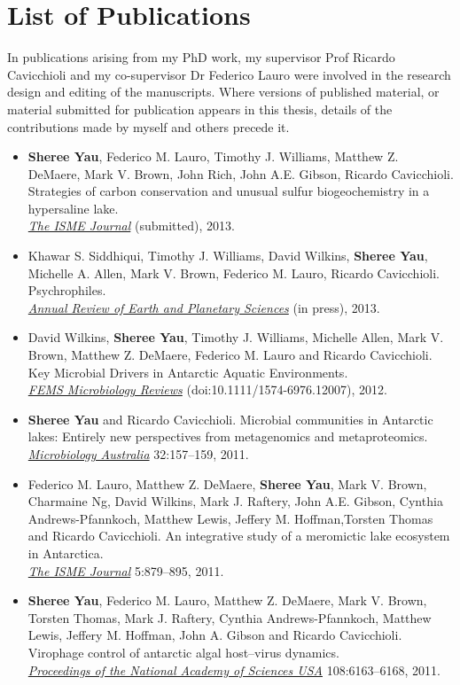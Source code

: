 \chapter*{List of Publications}
In publications arising from my PhD work, my supervisor Prof Ricardo Cavicchioli and my co-supervisor Dr Federico Lauro were
involved in the research design and editing of the manuscripts.
Where versions of published material, or material submitted for publication appears in this thesis, details of the contributions made by myself and others precede it.

\begin{itemize}

\item \textbf{Sheree Yau}, Federico M. Lauro, Timothy J. Williams, Matthew Z. DeMaere, Mark V. Brown, John Rich, John A.E. Gibson, Ricardo Cavicchioli. 
Strategies of carbon conservation and unusual sulfur biogeochemistry in a hypersaline lake. \\
\emph{\underline{The ISME Journal}}
(submitted), 2013.

\item Khawar S. Siddhiqui, Timothy J. Williams, David Wilkins, \textbf{Sheree Yau}, Michelle A. Allen, Mark V. Brown, Federico M. Lauro, Ricardo Cavicchioli.
Psychrophiles.\\
\emph{\underline{Annual Review of Earth and Planetary Sciences}}
(in press), 2013.

\item David Wilkins, \textbf{Sheree Yau}, Timothy J. Williams, Michelle Allen, Mark V. Brown, Matthew Z. DeMaere, Federico M. Lauro and Ricardo Cavicchioli.
Key Microbial Drivers in Antarctic Aquatic Environments.\\
\emph{\underline{FEMS Microbiology Reviews}} 
(doi:10.1111/1574-6976.12007), 2012.

\item \textbf{Sheree Yau} and Ricardo Cavicchioli. 
Microbial communities in Antarctic lakes: Entirely new perspectives from metagenomics and metaproteomics. \\
\emph{\underline{Microbiology Australia}} 32:157--159, 2011.

\item Federico M. Lauro, Matthew Z. DeMaere, \textbf{Sheree Yau}, Mark V. Brown, Charmaine Ng, David Wilkins, Mark J. Raftery, John A.E. Gibson, Cynthia Andrews-Pfannkoch, Matthew Lewis, Jeffery M. Hoffman,Torsten Thomas and Ricardo Cavicchioli. 
An integrative study of a meromictic lake ecosystem in Antarctica. \\
\emph{\underline{The ISME Journal}}
5:879--895, 2011.

\item \textbf{Sheree Yau}, Federico M. Lauro, Matthew Z. DeMaere, Mark V. Brown, Torsten Thomas, 
Mark J. Raftery, Cynthia Andrews-Pfannkoch, Matthew Lewis, Jeffery M. Hoffman, John A. Gibson and 
Ricardo Cavicchioli. 
Virophage control of antarctic algal host--virus dynamics. \\
\emph{\underline{Proceedings of the National Academy of Sciences USA}}
108:6163--6168, 2011.

\end{itemize}


